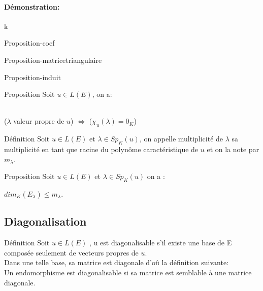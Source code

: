 \documentclass{book}
\begin{document}
\paragraph{Démonstration:}
k
\begin{Propriété}[]{}{Proposition-coef}
    
\end{Propriété}
\begin{Propriété}[]{}{Proposition-matricetriangulaire}
    
\end{Propriété}
\begin{Propriété}[]{}{Proposition-induit}
    
\end{Propriété}
\begin{Propriété}[]{Proposition}{}
Soit \(u \in L(E)\), on a:
\begin{center}
\\ (\(\lambda\) valeur propre de \(u\)) \(\Leftrightarrow\) (\(\chi_{u}(\lambda)=0_{K}\))
\end{center}
\end{Propriété}
\begin{Définition}[]{Définition}{}
Soit \(u \in L(E)\) et \(\lambda \in Sp_{K}(u)\), on appelle multiplicité de \(\lambda\) sa multiplicité en tant que racine du polynôme caractéristique de \(u\) et on la note par \(m_{\lambda}\).
\end{Définition}
\begin{Propriété}[]{Proposition}{}
Soit \(u \in L(E)\) et \(\lambda \in Sp_{K}(u)\) on a :
\begin{center}
    \(dim_{K}(E_{\lambda}) \leq m_{\lambda}\).
\end{center}

\end{Propriété}
\subsection{Diagonalisation}
\begin{Définition}[]{Définition}{}
Soit \(u \in L(E)\) , u est diagonalisable s'il existe une base de E composée seulement de vecteurs propres de \(u\).
\\ Dans une telle base, sa matrice est diagonale d'oû la définition suivante:
\\ Un endomorphisme est diagonalisable si sa matrice est semblable à une matrice diagonale.
\end{Définition}
\end{document}
